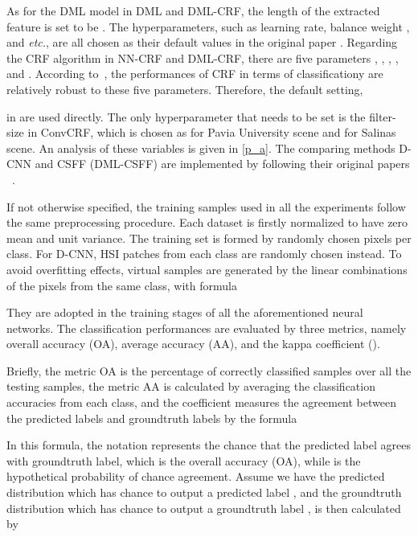 \documentclass[]{article}
\newcommand{\red}{\color{black}}
\newcommand{\magentaso}{\color{black}}
\newcommand{\orangesso}{\color{black}}
\begin{document}
As for the DML model in DML and DML-CRF, the length of the extracted feature is set to be 
. 
The hyperparameters, such as learning rate, balance weight , and {\em etc.}, 
are all chosen as {\magentaso their default values in the original paper \cite{guo2017spectral}}.
Regarding the CRF algorithm in NN-CRF and DML-CRF, there are five parameters 
, ,
, , and .
According to~\cite{krahenbuhl2011efficient},
the performances of CRF in terms of
classificationy are {\red relatively} robust to these five parameters. Therefore, the default setting,

in \cite{krahenbuhl2011efficient,teichmann2018convolutional} are used directly.
The only hyperparameter {\magentaso that needs} to be set is the filter-size  in ConvCRF, which is chosen as  for Pavia University scene and
 for Salinas scene.
{\red An analysis of these variables is given in \cref{p_a}.}
The comparing methods D-CNN and CSFF (DML-CSFF) are implemented by following 
{\magentaso their original papers }~\cite{chen2016deep,guo2018cnn}.


If not otherwise specified, the training samples used in all the experiments 
follow the same preprocessing procedure.
Each dataset is firstly normalized to have zero mean and unit variance. 
The training set is formed by randomly chosen  pixels per class.
For D-CNN,  HSI patches from each class are randomly chosen instead.
To avoid overfitting effects, virtual samples are generated {\magentaso by the linear combinations of the pixels from the same class, 
with formula}

{\magentaso They are adopted in the training stages of all the aforementioned neural networks.}
The classification {\magentaso performances are} evaluated by three metrics, namely overall accuracy (OA), 
average accuracy (AA), and the kappa coefficient ().
{\orangesso Briefly, the metric OA is the percentage of correctly classified samples over all the 
testing samples, 
the metric AA is calculated by averaging the classification accuracies from each class, 
and the coefficient  
measures the agreement between the predicted labels and groundtruth labels by the formula

In this formula, the notation  represents the chance that the predicted label agrees with groundtruth label, 
which is the overall accuracy (OA), while  is the hypothetical probability of chance agreement. 
Assume we have the predicted distribution which has chance  to output a predicted label , 
and the groundtruth distribution 
which has chance  to output a groundtruth label ,  is then calculated by 
}
\end{document}
